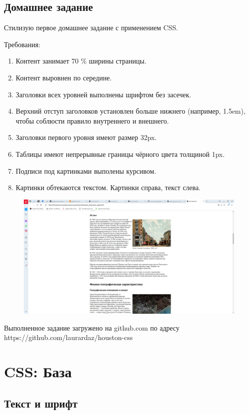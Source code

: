 \documentclass[14pt]{extreport}
\begin{document}
\section{Домашнее задание}

Стилизую первое домашнее задание с применением CSS.

Требования:
\begin{enumerate}
\item Контент занимает 70 \% ширины страницы.
\item Контент выровнен по середине.
\item Заголовки всех уровней выполнены шрифтом без засечек.
\item Верхний отступ заголовков установлен больше нижнего (например, 1.5em), чтобы соблюсти правило внутреннего и внешнего.
\item Заголовки первого уровня имеют размер 32px.
\item Таблицы имеют непрерывные границы чёрного цвета толщиной 1px.
\item Подписи под картинками выполены курсивом.
\item Картинки обтекаются текстом. Картинки справа, текст слева.

\end{enumerate}
\begin{figure}[H]
\centerline{\includegraphics[width=0.8\linewidth]{pics_practice/houston2.png}}
\caption{}
\label{8}
\end{figure}

Выполненное задание загружено на github.com по адресу https://github.com/laurardaz/houston-css





\chapter{CSS: База}

\section{Текст и шрифт}
\end{document}
